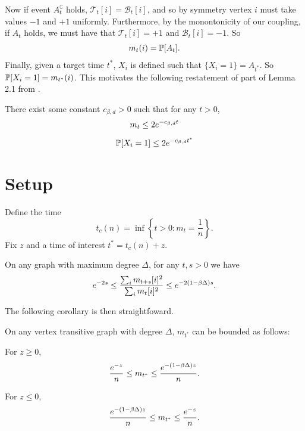 Now if event $A_t^\complement$ holds, $\mathcal{T}_t[i] = \mathcal{B}_t[i]$, and so by symmetry vertex $i$ must take values $-1$ and $+1$ uniformly. Furthermore, by the monontonicity of our coupling, if $A_t$ holds, we must have that $\mathcal{T}_t[i] = +1$ and $\mathcal{B}_t[i] = -1$.
So
\begin{align}
	m_t(i) = \mathbb{P}[A_t].
\end{align}
Finally, given a target time $t^*$, $X_i$ is defined such that $\{X_i = 1\} = A_{t^*}$. So $\mathbb{P}[X_i = 1] = m_{t^*}(i)$. This motivates the following restatement of part of Lemma 2.1 from \cite{Lubetzky2016-wd}.

\begin{lemma}
	There exist some constant $c_{\beta, d} > 0$ such that for any $t > 0$,
	\begin{equation}
		m_t \leq 2 e^{-c_{\beta, d} t}
	\end{equation}
\end{lemma}
\begin{corollary}
	\begin{equation}
		\mathbb{P}[X_i = 1] \leq 2 e^{-c_{\beta, d} t^*}
	\end{equation}
\end{corollary}

\section{Setup}
Define the time
\begin{equation}
	t_c(n) = \inf\left\{ t > 0 : m_t = \frac{1}{n}\right\}.
\end{equation}
Fix $z$ and a time of interest $t^* = t_c(n) + z$.

\begin{lemma}
	On any graph with maximum degree $\Delta$, for any $t, s > 0$ we have
	\begin{equation}
		e^{-2s} \leq \frac{\sum_i m_{t+s}[i]^2}{\sum_i m_t[i]^2} \leq e^{-2(1 - \beta \Delta)s}.
	\end{equation}
\end{lemma}

The following corollary is then straightfoward.
\begin{corollary}
\label{cor:magnetization of t star}
	On any vertex transitive graph with degree $\Delta$, $m_{t^*}$ can be bounded as follows:

	For $z \geq 0$,
	\begin{equation}
		\frac{e^{-z}}{n} \leq m_{t^*} \leq \frac{e^{-(1 - \beta \Delta)z}}{n}.
	\end{equation}

	For $z \leq 0$,
	\begin{equation}
		\frac{e^{-(1 - \beta \Delta)z}}{n} \leq m_{t^*} \leq \frac{e^{-z}}{n}.
	\end{equation}
\end{corollary}

